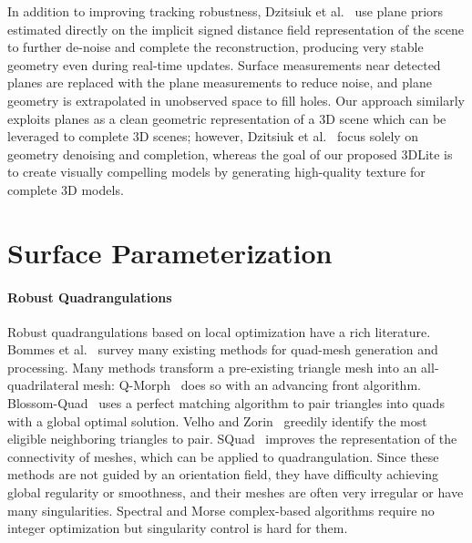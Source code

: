 In addition to improving tracking robustness, Dzitsiuk et al.~\cite{dzitsiuk2016noising} use plane priors estimated directly on the  implicit signed distance field representation of the scene to further de-noise and complete the reconstruction, producing very stable geometry even during real-time updates.
Surface measurements near detected planes are replaced with the plane measurements to reduce noise, and plane geometry is extrapolated in unobserved space to fill holes.
Our approach similarly exploits planes as a clean geometric representation of a 3D scene which can be leveraged to complete 3D scenes; however, Dzitsiuk et al.~\cite{dzitsiuk2016noising} focus solely on geometry denoising and completion, whereas the goal of our proposed 3DLite is to create visually compelling models by generating high-quality texture for complete 3D models.


\section{Surface Parameterization}
\label{related:param}
\paragraph*{Robust Quadrangulations}
Robust quadrangulations based on local optimization have a rich literature. Bommes et al.~\cite{bommes2013quad} survey many existing methods for quad-mesh generation and processing.  Many methods transform a pre-existing triangle mesh into an all-quadrilateral mesh: Q-Morph~\cite{owen1999q} does so with an advancing front algorithm.  Blossom-Quad~\cite{remacle2012blossom} uses a perfect matching algorithm to pair triangles into quads with a global optimal solution. Velho and Zorin~\cite{velho20014} greedily identify the most eligible neighboring triangles to pair. SQuad~\cite{gurung2011squad} improves the representation of the connectivity of meshes, which can be applied to quadrangulation.  Since these methods are not guided by an orientation field, they have difficulty achieving global regularity or smoothness, and their meshes are often very irregular or have many singularities.  Spectral and Morse complex-based algorithms \cite{dong2006spectral,zhang2010wave,ling2014spectral} require no integer optimization but singularity control is hard for them.

